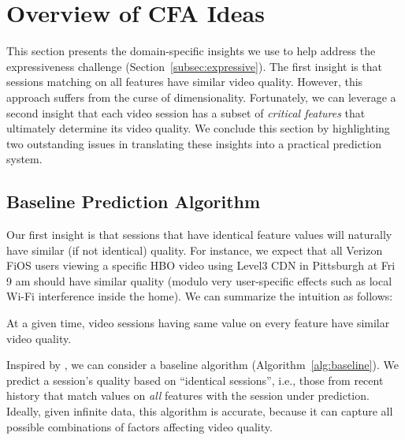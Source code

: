 \section{Overview of CFA Ideas}
\label{sec:cfa:outline}


This section presents the domain-specific insights we use to 
help address the expressiveness challenge 
(Section~\ref{subsec:expressive}).  
The first insight is that sessions matching on all features 
have similar video quality.  
However, this approach suffers from the curse of dimensionality.
Fortunately,  we can leverage a second insight that 
each video session has a subset of {\em critical features} 
that ultimately determine its video quality. 
We conclude this section  by highlighting two outstanding 
issues in translating these insights into  a practical 
prediction system.



\subsection{Baseline Prediction Algorithm}
\label{subsec:cfa:outline:basic}

Our  first insight is that 
sessions that have identical  feature values will 
naturally have similar (if not identical) quality. 
 For instance, we expect that all Verizon 
 FiOS users  viewing a specific  HBO  video 
using Level3 CDN in Pittsburgh at Fri 9 am should 
have similar quality (modulo very user-specific  effects 
such as local Wi-Fi interference inside the home).
We can summarize the intuition as follows:

\begin{insight}At a given time, video sessions having same value 
on every feature have similar video quality.
\label{insight:1}
\end{insight}


Inspired by , we can consider a 
baseline algorithm (Algorithm~\ref{alg:baseline}).
We predict a session's quality based on ``identical
sessions'', i.e., those from recent history that match 
values on {\em all} features with the session under 
prediction. 
Ideally, given infinite data, this 
algorithm is accurate, because it can capture
all possible combinations of factors affecting 
video quality.


